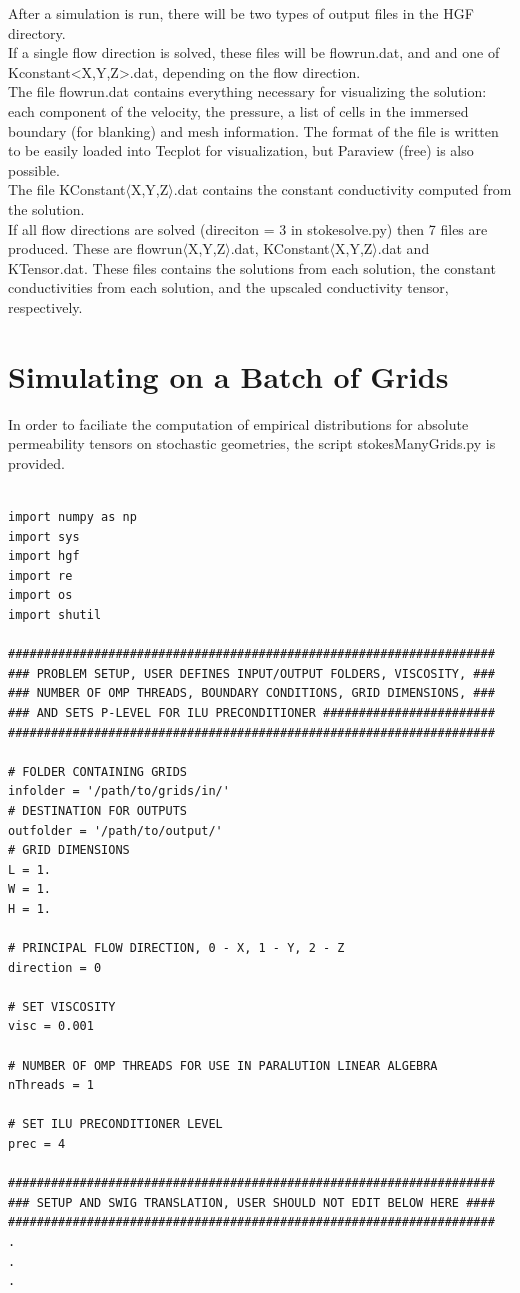 \documentclass{report}
\begin{document}
\noindent After a simulation is run, there will be two types of output files
in the HGF directory.\\

\noindent If a single flow direction is solved, these files will
be flowrun.dat,
and and one of Kconstant<X,Y,Z>.dat, depending on the flow direction.\\

\noindent The file flowrun.dat contains everything necessary for visualizing
the solution: each component of the velocity, the pressure,
a list of cells in the immersed boundary (for blanking) and
mesh information. The format of the file is written to be easily
loaded into Tecplot for visualization, but Paraview (free) is also
possible.\\

\noindent The file KConstant$\langle$X,Y,Z$\rangle$.dat contains the constant conductivity
computed from the solution.\\

\noindent If all flow directions are solved (direciton = 3 in stokesolve.py) then
7 files are produced. These are flowrun$\langle$X,Y,Z$\rangle$.dat,
KConstant$\langle$X,Y,Z$\rangle$.dat and
KTensor.dat. These files contains the solutions from each solution, the constant
conductivities from each solution, and the upscaled conductivity tensor, respectively.

\section{Simulating on a Batch of Grids}

\noindent In order to faciliate the computation of empirical distributions for absolute permeability
tensors on stochastic geometries, the script stokesManyGrids.py is provided.

\begin{lstlisting}

import numpy as np
import sys
import hgf
import re
import os
import shutil

####################################################################
### PROBLEM SETUP, USER DEFINES INPUT/OUTPUT FOLDERS, VISCOSITY, ###
### NUMBER OF OMP THREADS, BOUNDARY CONDITIONS, GRID DIMENSIONS, ###
### AND SETS P-LEVEL FOR ILU PRECONDITIONER ########################
####################################################################

# FOLDER CONTAINING GRIDS
infolder = '/path/to/grids/in/'
# DESTINATION FOR OUTPUTS
outfolder = '/path/to/output/'
# GRID DIMENSIONS
L = 1.
W = 1.
H = 1.

# PRINCIPAL FLOW DIRECTION, 0 - X, 1 - Y, 2 - Z
direction = 0

# SET VISCOSITY
visc = 0.001

# NUMBER OF OMP THREADS FOR USE IN PARALUTION LINEAR ALGEBRA
nThreads = 1

# SET ILU PRECONDITIONER LEVEL
prec = 4

####################################################################
### SETUP AND SWIG TRANSLATION, USER SHOULD NOT EDIT BELOW HERE ####
####################################################################
.
.
.
\end{lstlisting}
\end{document}
